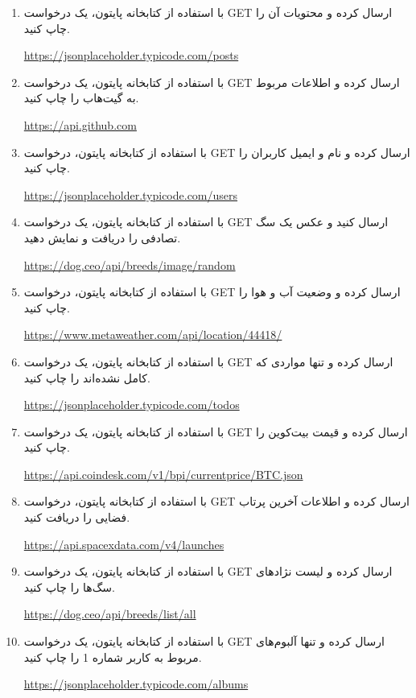 \documentclass[b5paper,12pt]{article}
\begin{document}
	\begin{enumerate}
		\item با استفاده از کتابخانه  پایتون، یک درخواست GET ارسال کرده و محتویات آن را چاپ کنید.
		\begin{flushleft}
			\url{https://jsonplaceholder.typicode.com/posts}
		\end{flushleft}
		\item با استفاده از کتابخانه  پایتون، یک درخواست GET ارسال کرده و اطلاعات مربوط به گیت‌هاب را چاپ کنید.
		\begin{flushleft}
			\url{https://api.github.com}
		\end{flushleft}
		\item با استفاده از کتابخانه  پایتون، درخواست GET ارسال کرده و نام و ایمیل کاربران را چاپ کنید.
		\begin{flushleft}
			\url{https://jsonplaceholder.typicode.com/users}
		\end{flushleft}
		\item با استفاده از کتابخانه  پایتون، یک درخواست GET ارسال کنید و عکس یک سگ تصادفی را دریافت و نمایش دهید.
		\begin{flushleft}
			\url{https://dog.ceo/api/breeds/image/random}
		\end{flushleft}
		\item با استفاده از کتابخانه  پایتون، درخواست GET ارسال کرده و وضعیت آب و هوا را چاپ کنید.
		\begin{flushleft}
			\url{https://www.metaweather.com/api/location/44418/}
		\end{flushleft}
		\item با استفاده از کتابخانه  پایتون، یک درخواست GET ارسال کرده و تنها مواردی که کامل نشده‌اند را چاپ کنید.
		\begin{flushleft}
			\url{https://jsonplaceholder.typicode.com/todos}
		\end{flushleft}
		\item با استفاده از کتابخانه  پایتون، یک درخواست GET ارسال کرده و قیمت بیت‌کوین را چاپ کنید.
		\begin{flushleft}
			\url{https://api.coindesk.com/v1/bpi/currentprice/BTC.json}
		\end{flushleft}
		\item با استفاده از کتابخانه  پایتون، درخواست GET ارسال کرده و اطلاعات آخرین پرتاب فضایی را دریافت کنید.
		\begin{flushleft}
			\url{https://api.spacexdata.com/v4/launches}
		\end{flushleft}
		\item با استفاده از کتابخانه  پایتون، یک درخواست GET ارسال کرده و لیست نژادهای سگ‌ها را چاپ کنید.
		\begin{flushleft}
			\url{https://dog.ceo/api/breeds/list/all}
		\end{flushleft}
		\item با استفاده از کتابخانه  پایتون، یک درخواست GET ارسال کرده و تنها آلبوم‌های مربوط به کاربر شماره 1 را چاپ کنید.
		\begin{flushleft}
			\url{https://jsonplaceholder.typicode.com/albums}
		\end{flushleft}
	\end{enumerate}
	
\end{document}
